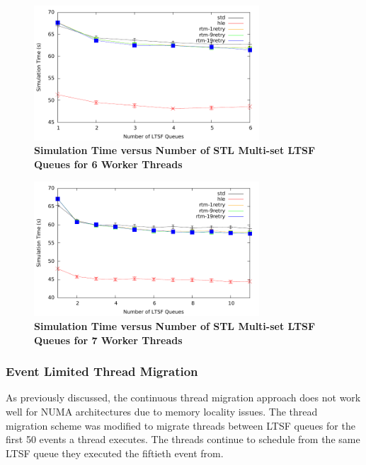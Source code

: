 \documentclass[11pt]{book}
\begin{document}
\begin{figure}[H]
    \centering
    \graphicspath{ {./figures/} }
    \includegraphics[width=0.75\textwidth,keepaspectratio]{contThrMig-hugeEpidemicSim-timeVSschedQs-multiset-6thread}
    \caption{\textbf{Simulation Time versus Number of STL Multi-set LTSF Queues
    for 6 Worker Threads}}
    \label{fig:contThrMig_timeVSschq_6threads}
\end{figure}

\begin{figure}[H]
    \centering
    \graphicspath{ {./figures/} }
    \includegraphics[width=0.75\textwidth,keepaspectratio]{contThrMig-hugeEpidemicSim-timeVSschedQs-multiset-7thread}
    \caption{\textbf{Simulation Time versus Number of STL Multi-set LTSF Queues
    for 7 Worker Threads}}
    \label{fig:contThrMig_timeVSschq_7threads}
\end{figure}

\subsubsection{Event Limited Thread Migration}

As previously discussed, the continuous thread migration approach does not work
well for NUMA architectures due to memory locality issues.  The thread migration
scheme was modified to migrate threads between LTSF queues for the first 50
events a thread executes.  The threads continue to schedule from the same LTSF
queue they executed the fiftieth event from.  
\end{document}
